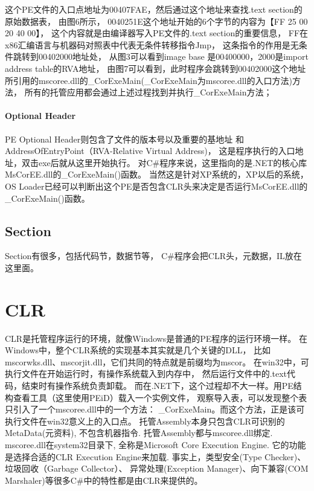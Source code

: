 \documentclass{book}
\begin{document}
这个PE文件的入口点地址为00407FAE，然后通过这个地址来查找.text section的原始数据表，
由图6所示，
0040251E这个地址开始的6个字节的内容为【FF 25 00 20 40 00】，
这个内容就是由编译器写入PE文件的.text section的重要信息，
FF在x86汇编语言与机器码对照表中代表无条件转移指令Jmp，
这条指令的作用是无条件跳转到00402000地址处，
从图3可以看到image base 是00400000，2000是import address table的RVA地址，
由图7可以看到，此时程序会跳转到00402000这个地址所引用的mscoree.dll的\_CorExeMain(\_CorExeMain为mscoree.dll的入口方法)方法，
所有的托管应用都会通过上述过程找到并执行\_CorExeMain方法；

\paragraph{Optional Header}PE Optional Header则包含了文件的版本号以及重要的基地址
和AddressOfEntryPoint（RVA-Relative Virtual Address)，
这是程序执行的入口地址，双击exe后就从这里开始执行。
对C\#程序来说，这里指向的是.NET的核心库MsCorEE.dll的\_CorExeMain()函数。
当然这是针对XP系统的，XP以后的系统，
OS Loader已经可以判断出这个PE是否包含CLR头来决定是否运行MsCorEE.dll的\_CorExeMain()函数。

\subsection{Section}Section有很多，包括代码节，数据节等，
C\#程序会把CLR头，元数据，IL放在这里面。

\section{CLR}

CLR是托管程序运行的环境，就像Windows是普通的PE程序的运行环境一样。
在Windows中，整个CLR系统的实现基本其实就是几个关键的DLL，
比如mscorwks.dll、mscorjit.dll，它们共同的特点就是前缀均为mscor。
在win32中，可执行文件在开始运行时，有操作系统载入到内存中，
然后运行文件中的.text代码，结束时有操作系统负责卸载。
而在.NET下，这个过程却不大一样。用PE结构查看工具（这里使用PEiD）载入一个实例文件，
观察导入表，可以发现整个表只引入了一个mscoree.dll中的一个方法：
\_CorExeMain。而这个方法，正是该可执行文件在win32意义上的入口点。
托管Assembly本身只包含CLR可识别的MetaData(元资料), 
不包含机器指令. 托管Assembly都与mscoree.dll绑定.
mscoree.dll在system32目录下, 全称是Microsoft Core Execution Engine. 
它的功能是选择合适的CLR Execution Engine来加载.
事实上，类型安全(Type Checker)、垃圾回收（Garbage Collector）、
异常处理(Exception Manager)、向下兼容(COM Marshaler)等很多C\#中的特性都是由CLR来提供的。
\end{document}
